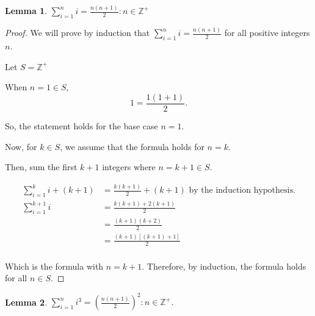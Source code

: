 \documentclass{article}
\newtheorem*{lemma}{Lemma}
\begin{document}
\begin{lemma}
    $\sum\limits_{i=1}^{n} i = \frac{n(n+1)}{2} : n \in \mathbb{Z}^{+}$
\end{lemma}

\begin{proof}
    We will prove by induction that $\sum\limits_{i=1}^{n} i = \frac{n(n+1)}{2}$ for all positive integers $n$.

    Let $S=\mathbb{Z}^{+}$
    
    When $n=1 \in S$, \[1=\frac{1(1+1)}{2}.\] %
    
    So, the statement holds for the base case $n=1$.
    
    Now, for $k \in S$, we assume that the formula holds for $n=k$. %
    
    Then, sum the first $k+1$ integers where $n=k+1 \in S$.
    
    \begin{align*}
        \sum\limits_{i=1}^{k} i + (k+1) &= \frac{k(k+1)}{2} + (k+1) \text{ by the induction hypothesis.} \\ %
        \sum\limits_{i=1}^{k+1} i &= \frac{k(k+1)+2(k+1)}{2} \\
        &= \frac{(k+1)(k+2)}{2} \\
        &= \frac{(k+1)[(k+1)+1]}{2} \\
    \end{align*}
    
    
    Which is the formula with $n=k+1$. 
    Therefore, by induction, the formula holds for all $n \in S$.\qedhere       
\end{proof}

\begin{lemma}
    $\sum\limits_{i=1}^{n} i^3 = {\left( \frac{n(n+1)}{2} \right)}^2 : n \in \mathbb{Z}^{+}$.
\end{lemma}
\end{document}
